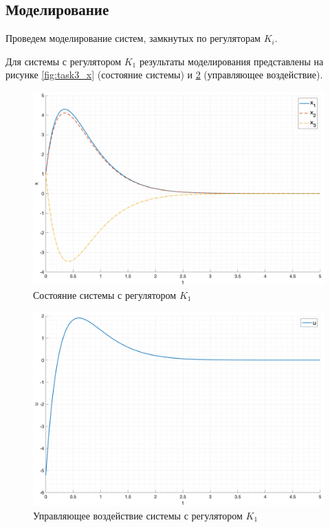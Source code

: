 \subsection{Моделирование}
Проведем моделирование систем, замкнутых по регуляторам $K_i$. 

Для системы с регулятором $K_1$ результаты моделирования представлены на рисунке \ref{fig:task3_x} 
(состояние системы) и \ref{fig:task3_1_u} (управляющее воздействие).

\begin{figure}[ht!]
    \centering
    \includegraphics[width=\textwidth]{media/plots/task3_1_x.png}
    \caption{Состояние системы с регулятором $K_1$}
    \label{fig:task3_1_x}
\end{figure}
\begin{figure}[ht!]
    \centering
    \includegraphics[width=\textwidth]{media/plots/task3_1_u.png}
    \caption{Управляющее воздействие системы с регулятором $K_1$}
    \label{fig:task3_1_u}
\end{figure}

